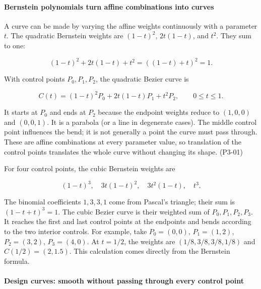 \paragraph{Bernstein polynomials turn affine combinations into curves}\label{03-visual-computing-i-ch001-bernstein-polynomials-turn-affine-combinations-into-curves}

\hypertarget{03-visual-computing-i-ch001-bernstein-polynomials-turn-affine-combinations-into-curves}{}

A curve can be made by varying the affine weights continuously with a parameter \(t\). The quadratic Bernstein weights are \((1-t)^2\), \(2t(1-t)\), and \(t^2\). They sum to one:

\[
(1-t)^2+2t(1-t)+t^2=((1-t)+t)^2=1.
\]

With control points \(P_0,P_1,P_2\), the quadratic Bezier curve is

\[
C(t)=(1-t)^2P_0+2t(1-t)P_1+t^2P_2,\qquad 0\leq t\leq1.
\]

It starts at \(P_0\) and ends at \(P_2\) because the endpoint weights reduce to \((1,0,0)\) and \((0,0,1)\). It is a parabola (or a line in degenerate cases). The middle control point influences the bend; it is not generally a point the curve must pass through. These are affine combinations at every parameter value, so translation of the control points translates the whole curve without changing its shape. (P3-01)

For four control points, the cubic Bernstein weights are

\[
(1-t)^3,\quad 3t(1-t)^2,\quad 3t^2(1-t),\quad t^3.
\]

The binomial coefficients \(1,3,3,1\) come from Pascal's triangle; their sum is \((1-t+t)^3=1\). The cubic Bezier curve is their weighted sum of \(P_0,P_1,P_2,P_3\). It reaches the first and last control points at the endpoints and bends according to the two interior controls. For example, take \(P_0=(0,0)\), \(P_1=(1,2)\), \(P_2=(3,2)\), \(P_3=(4,0)\). At \(t=1/2\), the weights are \((1/8,3/8,3/8,1/8)\) and \(C(1/2)=(2,1.5)\). This calculation comes directly from the Bernstein formula.

\paragraph{Design curves: smooth without passing through every control point}\label{03-visual-computing-i-ch001-design-curves-smooth-without-passing-through-every-control-point}

\hypertarget{03-visual-computing-i-ch001-design-curves-smooth-without-passing-through-every-control-point}{}

